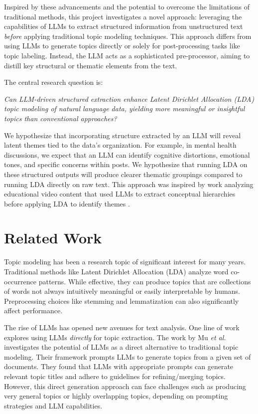 \documentclass{article}
\begin{document}
Inspired by these advancements and the potential to overcome the limitations of traditional methods, this project investigates a novel approach: leveraging the capabilities of LLMs to extract structured information from unstructured text \emph{before} applying traditional topic modeling techniques. This approach differs from using LLMs to generate topics directly or solely for post-processing tasks like topic labeling. Instead, the LLM acts as a sophisticated pre-processor, aiming to distill key structural or thematic elements from the text.

The central research question is:

\begin{center}
    \emph{Can LLM-driven structured extraction enhance Latent Dirichlet Allocation (LDA) topic modeling of natural language data, yielding more meaningful or insightful topics than conventional approaches?}
\end{center}

We hypothesize that incorporating structure extracted by an LLM will reveal latent themes tied to the data's organization. For example, in mental health discussions, we expect that an LLM can identify cognitive distortions, emotional tones, and specific concerns within posts. We hypothesize that running LDA on these structured outputs will produce clearer thematic groupings compared to running LDA directly on raw text. This approach was inspired by work analyzing educational video content that used LLMs to extract conceptual hierarchies before applying LDA to identify themes \citep{HramirEduConceptLibrarian}.

\section{Related Work}

Topic modeling has been a research topic of significant interest for many years. Traditional methods like Latent Dirichlet Allocation (LDA) \citep{Blei2003} analyze word co-occurrence patterns. While effective, they can produce topics that are collections of words not always intuitively meaningful or easily interpretable by humans. Preprocessing choices like stemming and lemmatization can also significantly affect performance.

The rise of LLMs has opened new avenues for text analysis. One line of work explores using LLMs \emph{directly} for topic extraction. The work by Mu \emph{et al.} investigates the potential of LLMs as a direct alternative to traditional topic modeling. Their framework prompts LLMs to generate topics from a given set of documents. They found that LLMs with appropriate prompts can generate relevant topic titles and adhere to guidelines for refining/merging topics. However, this direct generation approach can face challenges such as producing very general topics or highly overlapping topics, depending on prompting strategies and LLM capabilities.
\end{document}

